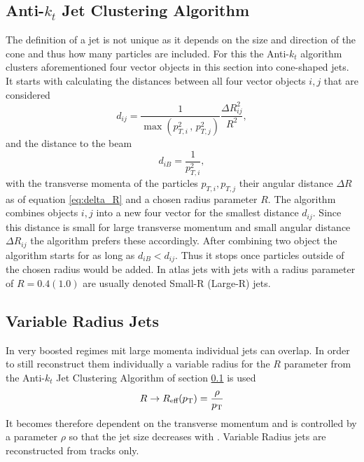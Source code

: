 \subsection{Anti-$k_t$ Jet Clustering Algorithm}\label{sec:anti_kt}
The definition of a jet is not unique as it depends on the size and direction of the cone and thus how many particles are included. For this the Anti-$k_t$ algorithm \citep{cacciari2008anti} clusters aforementioned four vector objects in this section into cone-shaped jets. It starts with calculating the distances between all four vector objects $i,j$ that are considered
\begin{equation}
    d_{ij}=\frac{1}{\max(p_{T,i}^{2}\,,\,p_{T,j}^{2})} \frac{\Delta R_{ij}^2}{R^2},
\end{equation}
and the distance to the beam 
\begin{equation}
    d_{iB}=\frac{1}{p_{T,i}^{2}},
\end{equation}
with the transverse momenta of the particles $p_{T,i},p_{T,j}$ their angular distance $\Delta R$ as of equation \ref{eq:delta_R} and a chosen radius parameter $R$. The algorithm combines objects $i,j$ into a new four vector for the smallest distance $d_{ij}$. Since this distance is small for large transverse momentum \pt and small angular distance $\Delta R_{ij}$ the algorithm prefers these accordingly. After combining two object the algorithm starts for as long as $d_{iB}<d_{ij}$. Thus it stops once particles outside of the chosen radius would be added. In \ac{atlas} jets with  jets with a radius parameter of $R=0.4 (1.0)$ are usually denoted Small-R (Large-R) jets.


\subsection{Variable Radius Jets}\label{sec:vr_jets}
In very boosted regimes mit large momenta individual jets can overlap. In order to still reconstruct them individually a variable radius for the $R$ parameter from the Anti-$k_t$ Jet Clustering Algorithm of section \ref{sec:anti_kt} is used
\begin{equation}
    R\rightarrow R_\text{eff}(p_{\text{T}})=\frac{\rho}{p_{\text{T}}}
\end{equation}
It becomes therefore dependent on the transverse momentum and is controlled by a parameter $\rho$ so that the jet size decreases with \pt. Variable Radius jets are reconstructed from tracks only. 

